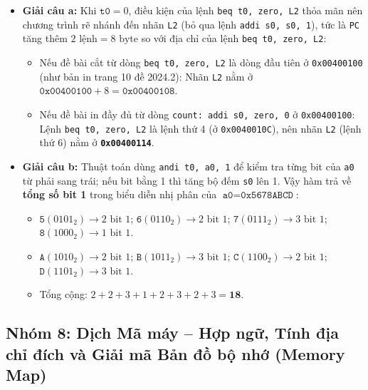 \begin{itemize}
    \item \textbf{Giải câu a:} Khi $\texttt{t0} = 0$, điều kiện của lệnh \texttt{beq t0, zero, L2} thỏa mãn nên chương trình rẽ nhánh đến nhãn \texttt{L2} (bỏ qua lệnh \texttt{addi s0, s0, 1}), tức là \texttt{PC} tăng thêm $2\text{ lệnh} = 8\text{ byte}$ so với địa chỉ của lệnh \texttt{beq t0, zero, L2}:
    \begin{itemize}
        \item Nếu đề bài cắt từ dòng \texttt{beq t0, zero, L2} là dòng đầu tiên ở \texttt{0x00400100} (như bản in trang 10 đề 2024.2): Nhãn \texttt{L2} nằm ở $\texttt{0x00400100} + 8 = \mathbf{\texttt{0x00400108}}$.
        \item Nếu đề bài in đầy đủ từ dòng \texttt{count: addi s0, zero, 0} ở \texttt{0x00400100}: Lệnh \texttt{beq t0, zero, L2} là lệnh thứ 4 (ở \texttt{0x0040010C}), nên nhãn \texttt{L2} (lệnh thứ 6) nằm ở \textbf{\texttt{0x00400114}}.
    \end{itemize}
    \item \textbf{Giải câu b:} Thuật toán dùng \texttt{andi t0, a0, 1} để kiểm tra từng bit của \texttt{a0} từ phải sang trái; nếu bit bằng 1 thì tăng bộ đếm \texttt{s0} lên 1. Vậy hàm trả về \textbf{tổng số bit 1} trong biểu diễn nhị phân của $\texttt{a0} = \texttt{0x5678ABCD}$:
    \begin{itemize}
        \item $\texttt{5} (0101_2) \rightarrow 2\text{ bit }1$; \quad $\texttt{6} (0110_2) \rightarrow 2\text{ bit }1$; \quad $\texttt{7} (0111_2) \rightarrow 3\text{ bit }1$; \quad $\texttt{8} (1000_2) \rightarrow 1\text{ bit }1$.
        \item $\texttt{A} (1010_2) \rightarrow 2\text{ bit }1$; \quad $\texttt{B} (1011_2) \rightarrow 3\text{ bit }1$; \quad $\texttt{C} (1100_2) \rightarrow 2\text{ bit }1$; \quad $\texttt{D} (1101_2) \rightarrow 3\text{ bit }1$.
        \item Tổng cộng: $2 + 2 + 3 + 1 + 2 + 3 + 2 + 3 = \mathbf{18}$.
    \end{itemize}
\end{itemize}

\subsection{Nhóm 8: Dịch Mã máy -- Hợp ngữ, Tính địa chỉ đích và Giải mã Bản đồ bộ nhớ (Memory Map)}

